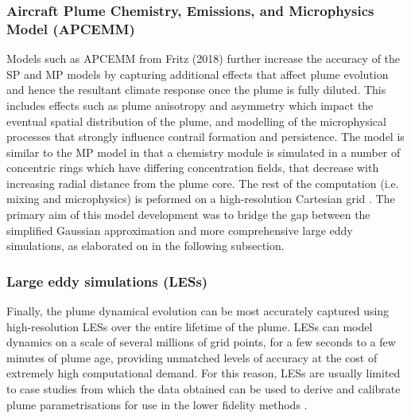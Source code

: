 \subsubsection{Aircraft Plume Chemistry, Emissions, and Microphysics Model (APCEMM)}
Models such as APCEMM from Fritz (2018) \cite{Fritz2018} further increase the accuracy of the SP and MP models by capturing additional effects that affect plume evolution and hence the resultant climate response once the plume is fully diluted. This includes effects such as plume anisotropy and asymmetry which impact the eventual spatial distribution of the plume, and modelling of the microphysical processes that strongly influence contrail formation and persistence. The model is similar to the MP model in that a chemistry module is simulated in a number of concentric rings which have differing concentration fields, that decrease with increasing radial distance from the plume core. The rest of the computation (i.e. mixing and microphysics) is peformed on a high-resolution Cartesian grid \cite{FritzConvo}. The primary aim of this model development was to bridge the gap between the simplified Gaussian approximation and more comprehensive large eddy simulations, as elaborated on in the following subsection.


\subsubsection{Large eddy simulations (LESs)}
Finally, the plume dynamical evolution can be most accurately captured using high-resolution LESs over the entire lifetime of the plume. LESs can model dynamics on a scale of several millions of grid points, for a few seconds to a few minutes of plume age, providing unmatched levels of accuracy at the cost of extremely high computational demand. For this reason, LESs are usually limited to case studies from which the data obtained can be used to derive and calibrate plume parametrisations for use in the lower fidelity methods \cite{Lewellen1998}. 

